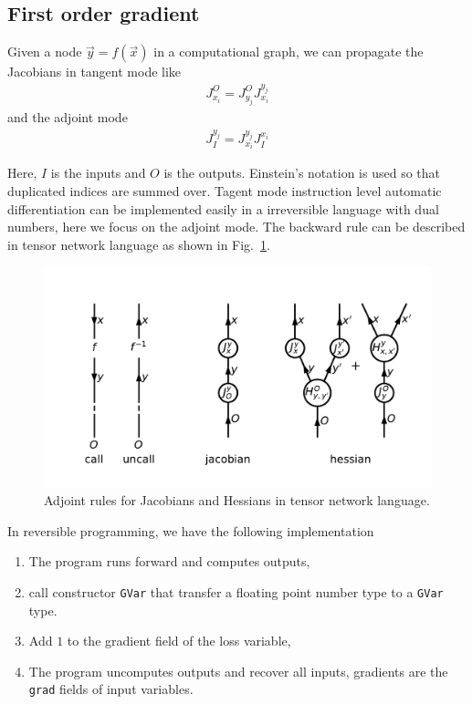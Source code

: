 \documentclass[aps,twocolumn,longbibliography,english,superscriptaddress,prr]{revtex4-1}
\newcommand{\<}{\langle}
\renewcommand{\>}{\rangle}
\newcommand{\out}{{O}}
\newcommand{\inp}{{I}}
\newcommand{\Fig}[1]{Fig.~\ref{#1}}
\theoremstyle{definition}\newtheorem{definition}{\textit{Definition}}
\begin{document}
\subsection{First order gradient}\label{sec:jacobian}
Given a node $\vec y = f(\vec x)$ in a computational graph, we can propagate the Jacobians in tangent mode like
\begin{align}
    J^\out_{x_i} = J^\out_{y_j} J^{y_j}_{x_i}
\end{align}
and the adjoint mode
\begin{align}
    J^{y_j}_\inp = J^{y_j}_{x_i} J_\inp^{x_i}
\end{align}

Here, $\inp$ is the inputs and $\out$ is the outputs.
Einstein's notation is used so that duplicated indices are summed over.
Tagent mode instruction level automatic differentiation can be implemented easily in a irreversible language with dual numbers,
here we focus on the adjoint mode.
The backward rule can be described in tensor network language as shown in \Fig{fig:ad}.
\begin{figure}
    \centerline{\includegraphics[width=\columnwidth,trim={0 1cm 0 1cm},clip]{images/ad.pdf}}
    \caption{Adjoint rules for Jacobians and Hessians in tensor network language.}\label{fig:ad}
\end{figure}

In reversible programming, we have the following implementation
\begin{enumerate}
    \item The program runs forward and computes outputs,
    \item call constructor \texttt{GVar} that transfer a floating point number type to a \texttt{GVar} type.
    \item Add $1$ to the gradient field of the loss variable,
    \item The program uncomputes outputs and recover all inputs, gradients are the \texttt{grad} fields of input variables.
\end{enumerate}
\end{document}
